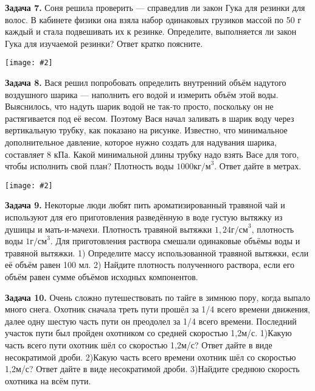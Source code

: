 \documentclass{article}
\newcommand{\pdt}[1]{
	\par
	\begin{minipage}{.95\linewidth}
	\setlength{\parindent}{2em}
	{#1}
	\end{minipage}
	\linebreak
}
\newcommand{\pdtpr}[4]{
	\par
	\begin{minipage}{#3\linewidth}
	\setlength{\parindent}{2em}
	{#1}
	\end{minipage}
	\begin{minipage}{#4\linewidth}
	{\texttt{[image: \#2]}}
	\end{minipage}
	\linebreak
}
\begin{document}
\pdtpr{
\Large\textbf{Задача 7.}
{Соня решила проверить — справедлив ли закон Гука для резинки для волос. В кабинете физики она взяла набор одинаковых грузиков массой по 50 г каждый и стала подвешивать их к резинке. Определите, выполняется ли закон Гука для изучаемой резинки? Ответ кратко поясните.}}
{guk1.png}{.5}{.45}
\linebreak
\pdtpr{
\Large\textbf{Задача 8.}
{Вася решил попробовать определить внутренний объём надутого воздушного шарика — наполнить его водой и измерить объём этой воды. Выяснилось, что надуть шарик водой не так-то просто, поскольку он не растягивается под её весом. Поэтому Вася начал заливать в шарик воду через вертикальную трубку, как показано на рисунке. Известно, что минимальное дополнительное давление, которое нужно создать для надувания шарика, составляет 8 кПа. Какой минимальной длины трубку надо взять Васе для того, чтобы исполнить свой план? Плотность воды $1000 \text{кг/м}^{3}$. Ответ дайте в метрах.
}}
{ballvol.png}{.8}{.15}

\pdt{
\Large\textbf{Задача 9.}
{Некоторые люди любят пить ароматизированный травяной чай и используют для его приготовления разведённую в воде густую вытяжку из душицы и мать-и-мачехи. Плотность травяной вытяжки $1,24 \text{г/см}^{3}$, плотность воды $1 \text{г/см}^{3}$. Для приготовления раствора смешали одинаковые объёмы воды и травяной вытяжки.
1) Определите массу использованной травяной вытяжки, если её объём равен 100 мл.
2) Найдите плотность полученного раствора, если его объём равен сумме объёмов исходных компонентов.}}

\pdt{
\Large\textbf{Задача 10.}
{Очень сложно путешествовать по тайге в зимнюю пору, когда выпало много снега. Охотник сначала треть пути прошёл за 1/4 всего времени движения, далее одну шестую часть пути он преодолел за 1/4 всего времени. Последний участок пути был пройден охотником со средней скоростью 1,2м/с.
1)Какую часть всего пути охотник шёл со скоростью 1,2м/с? Ответ дайте в виде несократимой дроби.
2)Какую часть всего времени охотник шёл со скоростью 1,2м/с? Ответ дайте в виде несократимой дроби.
3)Найдите среднюю скорость охотника на всём пути.}
}
\end{document}
